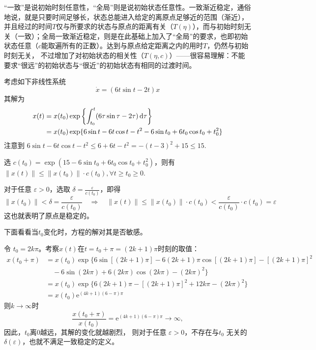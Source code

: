 \begin{note}
  “一致”是说初始时刻任意性，“全局”则是说初始状态任意性。一致渐近稳定，通俗地说，就是只要时间足够长，状态总能进入给定的离原点足够近的范围（渐近），
  并且经过的时间$T$仅与所要求的状态与原点的距离有关（$T(\eta)$），而与初始时刻无关（一致）；全局一致渐近稳定，则是在此基础上加入了“全局”的要求，也即初始状态任意（$c$能取遍所有的正数）。达到与原点给定距离之内的用时$T$，仍然与初始时刻无关，
  不过增加了对初始状态的相关性（$T(\eta,c)$）——很容易理解：不能要求“很远”的初始状态与“很近”的初始状态有相同的过渡时间。%
\end{note}
\begin{example}[稳定但不一致稳定]
  考虑如下非线性系统
  \[ \dot{x} = (6 t  \sin  t - 2 t) x \]
  其解为
  \begin{align*}
    x (t) & =  x (t_0) \exp \left\{ \int^t_{t_0} (6 \tau \sin \tau - 2 \tau)
    \mathop{}\!\mathrm{d} \tau \right\}\\
    & =  x (t_0) \exp \{ 6 \sin  t - 6 t  \cos  t - t^2 - 6 \sin  t_0 + 6
    t_0 \cos  t_0 + t^2_0 \}
  \end{align*}
  注意到 $6 \sin  t - 6 t  \cos  t - t^2 \leq 6 + 6 t - t^2 = - (t - 3)^2 + 15
  \leq 15$.
  
  选 $c (t_0) = \exp (15 - 6 \sin  t_0 + 6 t_0 \cos  t_0 + t^2_0)$，则有 $\| x (t) \| \leq \| x (t_0) \| \cdot c (t_0), \forall t
  \geq t_0 \geq 0$.
  
  对于任意 $\varepsilon > 0$，选取 $\delta = \frac{\varepsilon}{c (t_0)}$，即得
  \[ \| x (t_0) \| < \delta = \frac{\varepsilon}{c (t_0)} \quad \Rightarrow
     \quad \| x (t) \| \leq \| x (t_0) \| \cdot c (t_0) < \frac{\varepsilon}{c
     (t_0)} \cdot c (t_0) = \varepsilon \]
  这也就表明了原点是稳定的。
  
  下面看看当$t_0$变化时，方程的解对其是否敏感。

  令 $t_0 = 2 k \pi$。考察$x (t)$在$t = t_0 + \pi = (2 k + 1)\pi$时刻的取值：
  \begin{align*}
    x (t_0 + \pi) & =  x (t_0) \exp \{ 6 \sin [(2 k + 1) \pi] - 6 (2 k + 1)
    \pi \cos [(2 k + 1) \pi] - [(2 k + 1) \pi]^2 \\
    &  \quad - 6 \sin (2 k \pi) + 6 (2 k \pi) \cos (2 k \pi) - (2 k \pi)^2 \} \\
    & =  x (t_0) \exp \{ 6 (2 k + 1) \pi - [(2 k + 1) \pi]^2  + 12 k \pi -
    (2 k \pi)^2 \} \\
    & =  x (t_0) \mathrm{e}^{\left( \text{} 4 k + 1 \right) (6 - \pi) \pi}
  \end{align*}
  则$k \rightarrow\infty$时
  \[ \frac{x (t_0 + \pi)}{x (t_0)} = \mathrm{e}^{\left( \text{} 4 k + 1 \right) (6 -
     \pi) \pi} \rightarrow \infty,  \]
  因此，$t_0$离$0$越远，其解的变化就越剧烈，
  则对于任意 $\varepsilon > 0$，不存在与$t_0$ 无关的$\delta (\varepsilon)$，也就不满足一致稳定的定义。
\end{example}
